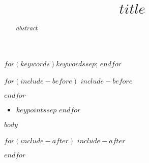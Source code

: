 \documentclass[$paper$,$reftype$]{$documentclass$}
\title{$title$}
\begin{document}
\begin{frontmatter}
\maketitle
\begin{abstract}
$abstract$
\end{abstract}

\begin{keywords}
$for(keywords)$$keywords$$sep$; $endfor$
\end{keywords}
\end{frontmatter}

$for(include-before)$
$include-before$

$endfor$

\begin{keypoints*}
\begin{itemize}
$for(keypoints)$\item{$keypoints$}$sep$
$endfor$
\end{itemize}
\end{keypoints*}

$body$


$for(include-after)$
$include-after$

$endfor$
\end{document}
